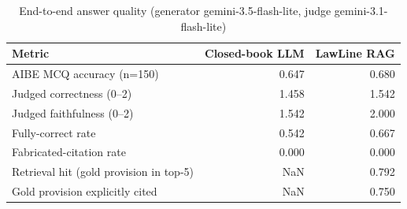 \begin{table}
\caption{End-to-end answer quality (generator gemini-3.5-flash-lite, judge gemini-3.1-flash-lite)}
\label{tab:answer}
\begin{tabular}{lrr}
\toprule
Metric & Closed-book LLM & LawLine RAG \\
\midrule
AIBE MCQ accuracy (n=150) & 0.647 & 0.680 \\
Judged correctness (0–2) & 1.458 & 1.542 \\
Judged faithfulness (0–2) & 1.542 & 2.000 \\
Fully-correct rate & 0.542 & 0.667 \\
Fabricated-citation rate & 0.000 & 0.000 \\
Retrieval hit (gold provision in top-5) & NaN & 0.792 \\
Gold provision explicitly cited & NaN & 0.750 \\
\bottomrule
\end{tabular}
\end{table}
